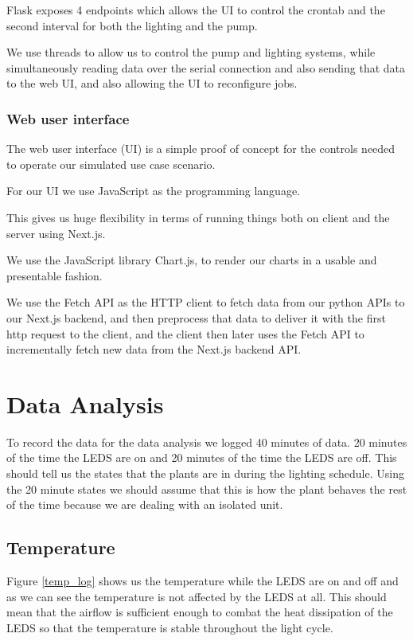 \documentclass[a4paper,12pt,twoside,openright,titlepage]{book}
\begin{document}
Flask exposes 4 endpoints which allows the UI to control the crontab and the second interval for both the lighting and the pump.

We use threads to allow us to control the pump and lighting systems, while simultaneously reading data over the serial connection and also sending that data to the web UI, and also allowing the UI to reconfigure jobs.

\subsection{Web user interface}
The web user interface (UI) is a simple proof of concept for the controls needed to operate our simulated use case scenario.

For our UI we use JavaScript as the programming language.

This gives us huge flexibility in terms of running things both on client and the server using Next.js.

We use the JavaScript library Chart.js, to render our charts in a usable and presentable fashion.

We use the Fetch API as the HTTP client to fetch data from our python APIs to our Next.js backend, and then preprocess that data to deliver it with the first http request to the client, and the client then later uses the Fetch API to incrementally fetch new data from the Next.js backend API.


\chapter{Data Analysis}
To record the data for the data analysis we logged 40 minutes of data. 20 minutes of the time the LEDS are on and 20 minutes of the time the LEDS are off. This should tell us the states that the plants are in during the lighting schedule. Using the 20 minute states we should assume that this is how the plant behaves the rest of the time because we are dealing with an isolated unit.

\section{Temperature}
Figure \ref{temp_log} shows us the temperature while the LEDS are on and off and as we can see the temperature is not affected by the LEDS at all. This should mean that the airflow is sufficient enough to combat the heat dissipation of the LEDS so that the temperature is stable throughout the light cycle.
\end{document}
